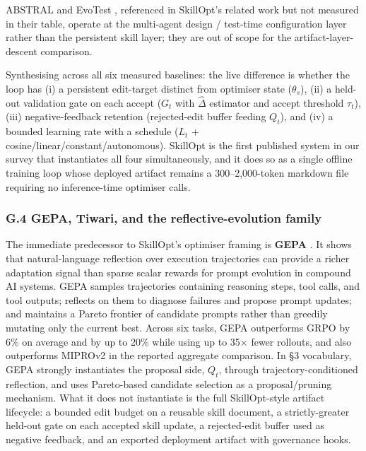ABSTRAL \citep{song2026abstral} and EvoTest \citep{he2025evotest},
referenced in SkillOpt's related work but not measured in their table,
operate at the multi-agent design / test-time configuration layer rather
than the persistent skill layer; they are out of scope for the
artifact-layer-descent comparison.

Synthesising across all six measured baselines: the live difference is
whether the loop has (i) a persistent edit-target distinct from
optimiser state (\(\theta_s\)), (ii) a held-out validation gate on each
accept (\(G_t\) with \(\widehat\Delta\) estimator and accept threshold
\(\tau_t\)), (iii) negative-feedback retention (rejected-edit buffer
feeding \(Q_t\)), and (iv) a bounded learning rate with a schedule
(\(L_t\) + cosine/linear/constant/autonomous). SkillOpt is the first
published system in our survey that instantiates all four
simultaneously, and it does so as a single offline training loop whose
deployed artifact remains a 300--2,000-token markdown file requiring no
inference-time optimiser calls.

\subsubsection{G.4 GEPA, Tiwari, and the reflective-evolution
family}\label{g.4-gepa-tiwari-and-the-reflective-evolution-family}

The immediate predecessor to SkillOpt's optimiser framing is
\textbf{GEPA} \citep{agrawal2025gepa}. It shows that natural-language
reflection over execution trajectories can provide a richer adaptation
signal than sparse scalar rewards for prompt evolution in compound AI
systems. GEPA samples trajectories containing reasoning steps, tool
calls, and tool outputs; reflects on them to diagnose failures and
propose prompt updates; and maintains a Pareto frontier of candidate
prompts rather than greedily mutating only the current best. Across six
tasks, GEPA outperforms GRPO by 6\% on average and by up to 20\% while
using up to 35× fewer rollouts, and also outperforms MIPROv2 in the
reported aggregate comparison. In §3 vocabulary, GEPA strongly
instantiates the proposal side, \(Q_t\), through trajectory-conditioned
reflection, and uses Pareto-based candidate selection as a
proposal/pruning mechanism. What it does not instantiate is the full
SkillOpt-style artifact lifecycle: a bounded edit budget on a reusable
skill document, a strictly-greater held-out gate on each accepted skill
update, a rejected-edit buffer used as negative feedback, and an
exported deployment artifact with governance hooks.

